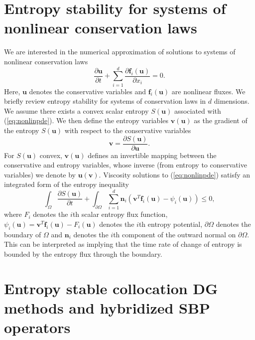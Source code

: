 \documentclass{svjour3}                     %
\newcommand{\pd}[2]{\frac{\partial#1}{\partial#2}}
\newcommand{\LRp}[1]{\left( #1 \right)}
\begin{document}
\section{Entropy stability for systems of nonlinear conservation laws}
\label{sec:0}
We are interested in the numerical approximation of solutions to systems of nonlinear conservation laws
\begin{equation}
\pd{\bm{u}}{t} + \sum_{i=1}^d \pd{\bm{f}_i\LRp{\bm{u}}}{x_i} = 0.
\label{eq:nonlinpde}
\end{equation}
Here, $\bm{u}$ denotes the conservative variables and $\bm{f}_i(\bm{u})$ are nonlinear fluxes.  We briefly review entropy stability for systems of conservation laws in $d$ dimensions.  We assume there exists a convex scalar entropy $S(\bm{u})$ associated with (\ref{eq:nonlinpde}).  We then define the entropy variables $\bm{v}(\bm{u})$ as the gradient of the entropy $S(\bm{u})$ with respect to the conservative variables 
\[
\bm{v} = \pd{S(\bm{u})}{\bm{u}}.  
\]
For $S(\bm{u})$ convex, $\bm{v}(\bm{u})$ defines an invertible mapping between the conservative and entropy variables, whose inverse (from entropy to conservative variables) we denote by $\bm{u}(\bm{v})$.  Viscosity solutions to (\ref{eq:nonlinpde}) satisfy an integrated form of the entropy inequality \cite{dafermos2005compensated}
\begin{equation}
\int_{\Omega} \pd{S(\bm{u})}{t} + \int_{\partial \Omega} \sum_{i=1}^d \bm{n}_i \LRp{\bm{v}^T\bm{f}_i(\bm{u}) - \psi_i(\bm{u})} \leq 0,
\label{eq:weakentropyineq}
\end{equation}
where $F_i$ denotes the $i$th scalar entropy flux function, $\psi_i(\bm{u}) = \bm{v}^T\bm{f}_i(\bm{u}) - F_i(\bm{u})$ denotes the $i$th entropy potential, $\partial \Omega$ denotes the boundary of $\Omega$ and $\bm{n}_i$ denotes the $i$th component of the outward normal on $\partial \Omega$.  This can be interpreted as implying that the time rate of change of entropy is bounded by the entropy flux through the boundary.



\section{Entropy stable collocation DG methods and hybridized SBP operators}
\label{sec:1}
\end{document}
